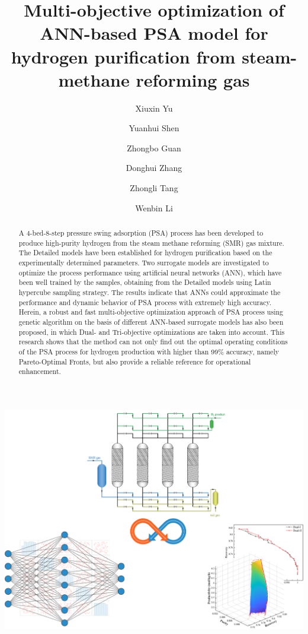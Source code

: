 \documentclass[preprint,12pt]{elsarticle}
\begin{document}
	
	\begin{frontmatter}
		
		\title{Multi-objective optimization of ANN-based PSA model for hydrogen purification from steam-methane reforming gas}
		
		\author{Xiuxin Yu}
		\author{Yuanhui Shen}
		\author{Zhongbo Guan}
		\author{Donghui Zhang}
		\author{Zhongli Tang}
		\author{Wenbin Li}
		
		\address{The Research Center of Chemical Engineering, School of Chemical Engineering and Technology, Tianjin University, Tianjin 300072, China}
		
		\begin{abstract}
			A 4-bed-8-step pressure swing adsorption (PSA) process has been developed to produce high-purity hydrogen from the steam methane reforming (SMR) gas mixture. The Detailed models have been established for hydrogen purification based on the experimentally determined parameters. Two surrogate models are investigated to optimize the process performance using artificial neural networks (ANN), which have been well trained by the samples, obtaining from the Detailed models using Latin hypercube sampling strategy. The results indicate that ANNs could approximate the performance and dynamic behavior of PSA process with extremely high accuracy. Herein, a robust and fast multi-objective optimization approach of PSA process using genetic algorithm on the basis of different ANN-based surrogate models has also been proposed, in which Dual- and Tri-objective optimizations are taken into account. This research shows that the method can not only find out the optimal operating conditions of the PSA process for hydrogen production with higher than 99\% accuracy, namely Pareto-Optimal Fronts, but also provide a reliable reference for operational enhancement.
		\end{abstract}
		
		\begin{graphicalabstract}
			\includegraphics[width=1\textwidth]{figs/Graphical Abstract.pdf}
		\end{graphicalabstract}
		

\end{frontmatter}
\end{document}
